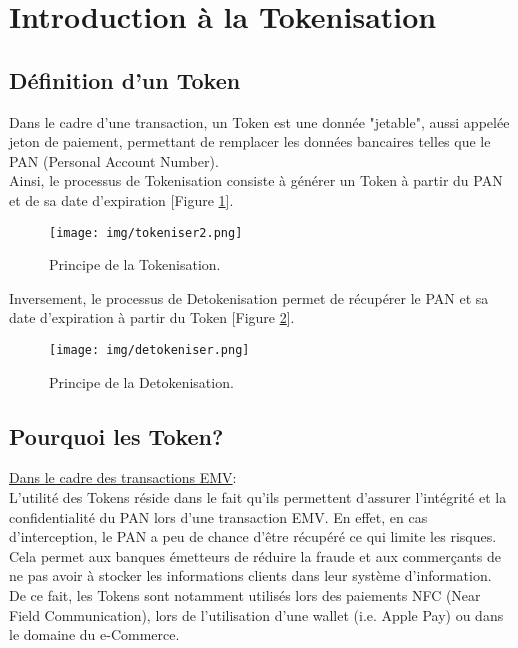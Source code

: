 \documentclass{report}
\begin{document}
\section{Introduction à la Tokenisation}
\subsection{Définition d'un Token}
Dans le cadre d'une transaction, un Token est une donnée "jetable", aussi appelée jeton de paiement, permettant de remplacer les données bancaires telles que le PAN (Personal Account Number).\\
Ainsi, le processus de Tokenisation consiste à générer un Token à partir du PAN et de sa date d'expiration [Figure \ref{Tokenisation}].

\begin{figure}[!h]
    \centering
			\texttt{[image: img/tokeniser2.png]}
			\caption{\label{Tokenisation} Principe de la Tokenisation.}			
\end{figure}

Inversement, le processus de Detokenisation permet de récupérer le PAN et sa date d'expiration à partir du Token [Figure \ref{Detokenisation}]. 

\begin{figure}[!h]
    \centering
			\texttt{[image: img/detokeniser.png]}
			\caption{\label{Detokenisation} Principe de la Detokenisation.}			
\end{figure}

\subsection{Pourquoi les Token?}
\noindent
\underline{Dans le cadre des transactions EMV}:\\

\noindent
L'utilité des Tokens réside dans le fait qu'ils permettent d'assurer l'intégrité et la confidentialité du PAN lors d'une transaction EMV. En effet, en cas d'interception, le PAN a peu de chance d'être récupéré ce qui limite les risques. Cela permet aux banques émetteurs de réduire la fraude et aux commerçants de ne pas avoir à stocker les informations clients dans leur système d'information.\\

\noindent
De ce fait, les Tokens sont notamment utilisés lors des paiements NFC (Near Field Communication), lors de l'utilisation d'une wallet (i.e. Apple Pay) ou dans le domaine du e-Commerce.\\
\end{document}
